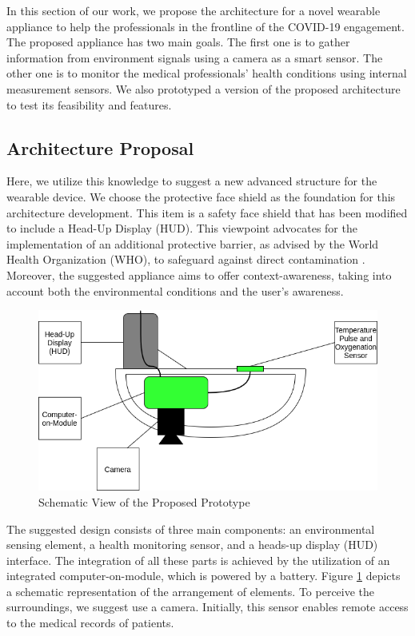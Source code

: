 In this section of our work, we propose the architecture for a novel wearable appliance to help the professionals in the frontline of the COVID-19 engagement. The proposed appliance has two main goals. The first one is to gather information from environment signals using a camera as a smart sensor. The other one is to monitor the medical professionals' health conditions using internal measurement sensors. We also prototyped a version of the proposed architecture to test its feasibility and features.

\subsection{{Architecture Proposal}}

Here, we utilize this knowledge to suggest a new advanced structure for the wearable device. We choose the protective face shield as the foundation for this architecture development. This item is a safety face shield that has been modified to include a Head-Up Display (HUD). This viewpoint advocates for the implementation of an additional protective barrier, as advised by the World Health Organization (WHO), to safeguard against direct contamination \cite{world2020advice}. Moreover, the suggested appliance aims to offer context-awareness, taking into account both the environmental conditions and the user's awareness.

\begin{figure}[h!]
    \centering
    \includegraphics[width = .6\linewidth]{Figures/fs-schematics.png}
    \caption{Schematic View of the Proposed Prototype}
    \label{fig:fs-schematic}
\end{figure}

The suggested design consists of three main components: an environmental sensing element, a health monitoring sensor, and a heads-up display (HUD) interface. The integration of all these parts is achieved by the utilization of an integrated computer-on-module, which is powered by a battery. Figure \ref{fig:fs-schematic} depicts a schematic representation of the arrangement of elements. To perceive the surroundings, we suggest use a camera. Initially, this sensor enables remote access to the medical records of patients. 

